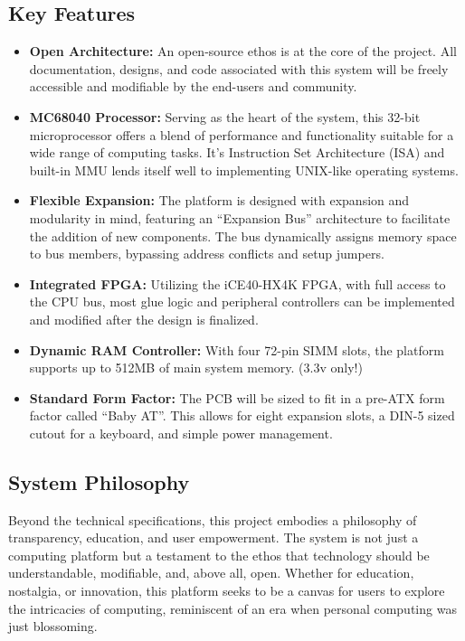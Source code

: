 \documentclass{article}
\begin{document}
\subsection{Key Features}
\begin{itemize}
	\item \textbf{Open Architecture:} An open-source ethos is at the core of the
	project. All documentation, designs, and code associated with this
	system will be freely accessible and modifiable by the end-users and
	community.

	\item \textbf{MC68040 Processor:} Serving as the heart of the system, this 32-bit
	microprocessor offers a blend of performance and functionality suitable
	for a wide range of computing tasks. It's Instruction Set Architecture
	(ISA) and built-in MMU lends itself well to implementing UNIX-like
	operating systems.

	\item \textbf{Flexible Expansion:} The platform is designed with expansion and
	modularity in mind, featuring an ``Expansion Bus'' architecture to
	facilitate the addition of new components. The bus dynamically assigns
	memory space to bus members, bypassing address conflicts and setup
	jumpers.

	\item \textbf{Integrated FPGA:} Utilizing the iCE40-HX4K FPGA, with full access
	to the CPU bus, most glue logic and peripheral controllers can be
	implemented and modified after the design is finalized.

	\item \textbf{Dynamic RAM Controller:} With four 72-pin SIMM slots, the platform
	supports up to 512MB of main system memory. (3.3v only!)

	\item \textbf{Standard Form Factor:} The PCB will be sized to fit in a pre-ATX
	form factor called ``Baby AT''. This allows for eight expansion slots,
	a DIN-5 sized cutout for a keyboard, and simple power management.
\end{itemize}

\subsection{System Philosophy}

Beyond the technical specifications, this project embodies a philosophy of
transparency, education, and user empowerment. The system is not just a
computing platform but a testament to the ethos that technology should be
understandable, modifiable, and, above all, open. Whether for education,
nostalgia, or innovation, this platform seeks to be a canvas for users to
explore the intricacies of computing, reminiscent of an era when personal
computing was just blossoming.
\end{document}
